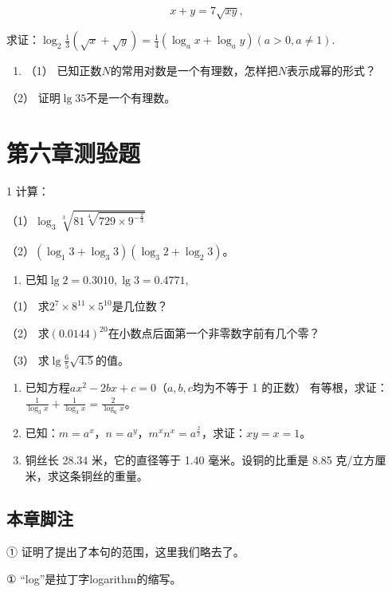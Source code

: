 \[
x + y = 7 \sqrt{x y},
\]

求证：\(\log_2\frac{1}{3} (\sqrt{x} +\sqrt{y}) = \frac{1}{4} (\log_a x + \log_a y)(a > 0,a\neq 1).\)

\begin{enumerate}[start=8]
\item
  （1） 已知正数\(N\)的常用对数是一个有理数，怎样把\(N\)表示成幂的形式？
\end{enumerate}

（2） 证明\(\lg 35\)不是一个有理数。

\section{第六章测验题}

1 计算：

（1）\(\log_3\sqrt[3]{81\sqrt[4]{729\times9^{-\frac{2}{3}}}}\)

（2）\((\log_{1}3 + \log_{3}3)(\log_{3}2 + \log_{2}3)\)。

\begin{enumerate}[start=2]
\item
  已知\(\lg 2 = 0.3010, \lg 3 = 0.4771,\)
\end{enumerate}

（1） 求\(2^{7} \times 8^{11} \times 5^{10}\)是几位数？

（2） 求\((0.0144)^{20}\)在小数点后面第一个非零数字前有几个零？

（3） 求\(\lg\frac{6}{5}\sqrt{4.5}\)的值。

\begin{enumerate}[start=3]
\item
  已知方程\(ax^2 - 2bx + c = 0\)（\(a, b, c\)均为不等于 1 的正数）
  有等根，求证：\(\frac{1}{\log_3 x} + \frac{1}{\log_3 x} = \frac{2}{\log_6 x}\)。
\item
  已知：\(m=a^{x}\)，\(n=a^{y}\)，\(m^{x}n^{x}=a^{\frac{2}{x}}\)，求证：\(xy=x=1\)。
\item
  铜丝长 28.34 米，它的直径等于 1.40 毫米。设铜的比重是 8.85
  克/立方厘米，求这条铜丝的重量。
\end{enumerate}

\subsection{本章脚注}

① 证明了提出了本句的范围，这里我们略去了。

① ``log''是拉丁字logarithm的缩写。

